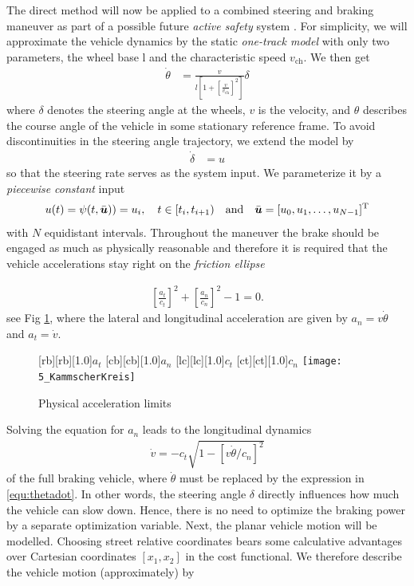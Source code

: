 The direct method will now be applied to a combined steering and braking maneuver as part of a possible future \emph{active safety} system \cite{werling2012cdc}. %
For simplicity, we will approximate the vehicle dynamics by the static \emph{one-track model} with only two parameters, the wheel base l and the characteristic speed $v_\mathrm{ch}$. We then get
\begin{align}
\label{equ:thetadot}
\dot \theta &= \frac{v}{l \left[ 1 + \left[\frac{v}{v_{\text{ch}}}\right]^2\right]} \delta
\end{align}
where $\delta$ denotes the steering angle at the wheels, $v$ is the velocity, and $\theta$ describes the course angle of the vehicle in some stationary reference frame. To avoid discontinuities in the steering angle trajectory, we extend the model by
\begin{align*}
\dot \delta &= u
\end{align*}
so that the steering rate serves as the system input. We parameterize it by a \emph{piecewise constant} input
\begin{align*}
u(t)=\psi(t,\bar{\boldsymbol{u}}))=u_i, \quad  t \in [t_i,t_{i+1}) \quad \text{and} \quad \bar{\boldsymbol{u}} = [u_0,u_1,\dots,u_{N-1}]^{{\rm T}}
\end{align*}
with $N$ equidistant intervals.
Throughout the maneuver the brake should be engaged as much as physically reasonable and therefore it is required that the vehicle accelerations stay right on the \emph{friction ellipse}

\begin{align} \label{equ:ellipse}
\left[\frac{a_t}{c_t}\right]^2 + \left[\frac{a_n}{c_n}\right]^2 -1 = 0.
\end{align}
see Fig \ref{fig:kammscherKreis}, where the lateral and longitudinal acceleration are given by $a_n=v \dot{\theta}$ and $a_t=\dot{v}$.
\begin{figure}[h]%
\centering
    [rb][rb][1.0]{$a_t$}
    [cb][cb][1.0]{$a_n$}
    [lc][lc][1.0]{$c_t$}
    [ct][ct][1.0]{$c_n$}
    \texttt{[image: 5\_KammscherKreis]}
    \caption[Physical acceleration limits]{Physical acceleration limits}
    \label{fig:kammscherKreis}
\end{figure}%
Solving the equation for $a_n$ leads to the longitudinal dynamics 
\begin{align} \label{equ:replacement}
	\dot v = -c_t \sqrt{1-[v\dot\theta / c_n]^2}
\end{align}
of the full braking vehicle, where $\dot{\theta}$ must be replaced by the expression in \eqref{equ:thetadot}. 
In other words, the steering angle $\delta$ directly influences how much the vehicle can slow down. 
Hence, there is no need to optimize the braking power by a separate optimization variable. 
Next, the planar vehicle motion will be modelled. 
Choosing street relative coordinates bears some calculative advantages over Cartesian coordinates $[x_1,x_2]$ in the cost functional. We therefore describe the vehicle motion (approximately) by


